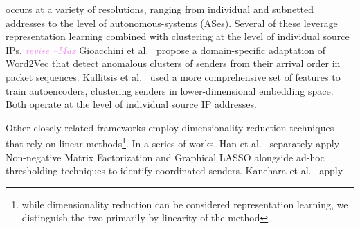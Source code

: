 \documentclass[manuscript,nonacm]{acmart}
\newcommand{\maxnote}[1]{\textit{\textcolor{violet}{#1 --Max}}}
\begin{document}


 occurs at a variety of resolutions, ranging from individual and subnetted addresses to the level of autonomous-systems (ASes).
Several of these leverage representation learning combined with clustering at the level of individual source IPs. \maxnote{revise}
Gioacchini et al.~\cite{@@} propose a domain-specific adaptation of Word2Vec that detect anomalous clusters of senders from their arrival order in packet sequences. 
Kallitsis et al.~\cite{@@} used a more comprehensive set of features to train autoencoders, clustering senders in lower-dimensional embedding space.
Both operate at the level of individual source IP addresses. 

Other closely-related frameworks employ dimensionality reduction techniques that rely on linear methods\footnote{while dimensionality reduction can be considered representation learning, we distinguish the two primarily by linearity of the method}.
In a series of works, Han et al.~\cite{@@} separately apply Non-negative Matrix Factorization and Graphical LASSO alongside ad-hoc thresholding techniques to identify coordinated senders.
Kanehara et al.~\cite{@@} apply 





\vspace{0.25em}
\end{document}
